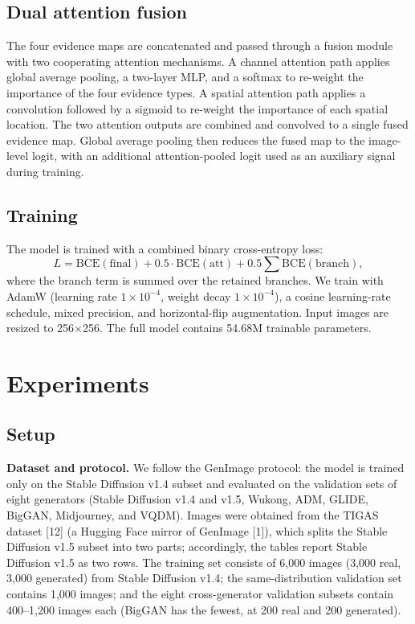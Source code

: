 \documentclass[11pt,a4paper]{article}
\begin{document}
\subsection{Dual attention fusion}

The four evidence maps are concatenated and passed through a fusion module with two cooperating attention mechanisms. A channel attention path applies global average pooling, a two-layer MLP, and a softmax to re-weight the importance of the four evidence types. A spatial attention path applies a convolution followed by a sigmoid to re-weight the importance of each spatial location. The two attention outputs are combined and convolved to a single fused evidence map. Global average pooling then reduces the fused map to the image-level logit, with an additional attention-pooled logit used as an auxiliary signal during training.

\subsection{Training}

The model is trained with a combined binary cross-entropy loss:
\begin{equation}
L = \mathrm{BCE}(\mathrm{final}) + 0.5\cdot\mathrm{BCE}(\mathrm{att}) + 0.5\sum \mathrm{BCE}(\mathrm{branch}),
\end{equation}
where the branch term is summed over the retained branches. We train with AdamW (learning rate $1\times 10^{-4}$, weight decay $1\times 10^{-4}$), a cosine learning-rate schedule, mixed precision, and horizontal-flip augmentation. Input images are resized to 256$\times$256. The full model contains 54.68M trainable parameters.

\section{Experiments}

\subsection{Setup}

\textbf{Dataset and protocol.} We follow the GenImage protocol: the model is trained only on the Stable Diffusion v1.4 subset and evaluated on the validation sets of eight generators (Stable Diffusion v1.4 and v1.5, Wukong, ADM, GLIDE, BigGAN, Midjourney, and VQDM). Images were obtained from the TIGAS dataset [12] (a Hugging Face mirror of GenImage [1]), which splits the Stable Diffusion v1.5 subset into two parts; accordingly, the tables report Stable Diffusion v1.5 as two rows. The training set consists of 6,000 images (3,000 real, 3,000 generated) from Stable Diffusion v1.4; the same-distribution validation set contains 1,000 images; and the eight cross-generator validation subsets contain 400--1,200 images each (BigGAN has the fewest, at 200 real and 200 generated).
\end{document}
